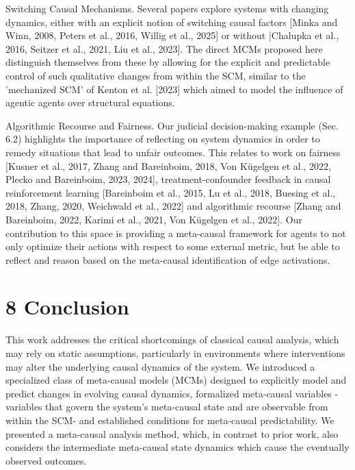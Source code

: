 \documentclass[10pt]{article}
\begin{document}
Switching Causal Mechanisms. Several papers explore systems with changing dynamics, either with an explicit notion of switching causal factors [Minka and Winn, 2008, Peters et al., 2016, Willig et al., 2025] or without |Chalupka et al., 2016, Seitzer et al., 2021, Liu et al., 2023]. The direct MCMs proposed here distinguish themselves from these by allowing for the explicit and predictable control of such qualitative changes from within the SCM, similar to the 'mechanized SCM' of Kenton et al. [2023] which aimed to model the influence of agentic agents over structural equations.

Algorithmic Recourse and Fairness. Our judicial decision-making example (Sec. 6.2) highlights the importance of reflecting on system dynamics in order to remedy situations that lead to unfair outcomes. This relates to work on fairness [Kusner et al., 2017, Zhang and Bareinboim, 2018, Von Kügelgen et al., 2022, Plecko and Bareinboim, 2023, 2024], treatment-confounder feedback in causal reinforcement learning [Bareinboim et al., 2015, Lu et al., 2018, Buesing et al., 2018, Zhang, 2020, Weichwald et al., 2022] and algorithmic recourse [Zhang and Bareinboim, 2022, Karimi et al., 2021, Von Kügelgen et al., 2022]. Our contribution to this space is providing a meta-causal framework for agents to not only optimize their actions with respect to some external metric, but be able to reflect and reason based on the meta-causal identification of edge activations.

\section*{8 Conclusion}
This work addresses the critical shortcomings of classical causal analysis, which may rely on static assumptions, particularly in environments where interventions may alter the underlying causal dynamics of the system. We introduced a specialized class of meta-causal models (MCMs) designed to explicitly model and predict changes in evolving causal dynamics, formalized meta-causal variables -variables that govern the system's meta-causal state and are observable from within the SCM- and established conditions for meta-causal predictability. We presented a meta-causal analysis method, which, in contrast to prior work, also considers the intermediate meta-causal state dynamics which cause the eventually observed outcomes.
\end{document}
